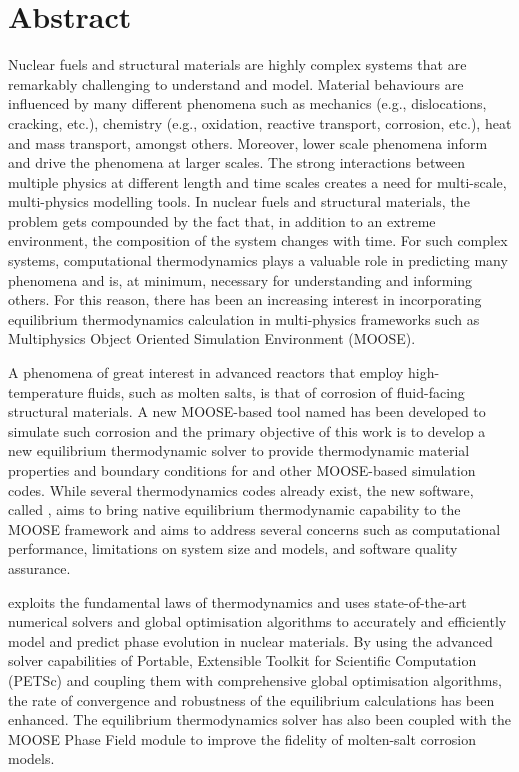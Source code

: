 \chapter*{Abstract}

Nuclear fuels and structural materials are highly complex systems that are remarkably challenging to understand and model. Material behaviours are influenced by many different phenomena such as mechanics (e.g., dislocations, cracking, etc.), chemistry (e.g., oxidation, reactive transport, corrosion, etc.), heat and mass transport, amongst others. Moreover, lower scale phenomena inform and drive the phenomena at larger scales. The strong interactions between multiple physics at different length and time scales creates a need for multi-scale, multi-physics modelling tools. In nuclear fuels and structural materials, the problem gets compounded by the fact that, in addition to an extreme environment, the composition of the system changes with time. For such complex systems, computational thermodynamics plays a valuable role in predicting many phenomena and is, at minimum, necessary for understanding and informing others. For this reason, there has been an increasing interest in incorporating equilibrium thermodynamics calculation in multi-physics frameworks such as Multiphysics Object Oriented Simulation Environment (MOOSE).

A phenomena of great interest in advanced reactors that employ high-temperature fluids, such as molten salts, is that of corrosion of fluid-facing structural materials. A new MOOSE-based tool named {\YJ} has been developed to simulate such corrosion and the primary objective of this work is to develop a new equilibrium thermodynamic solver to provide thermodynamic material properties and boundary conditions for {\YJ} and other MOOSE-based simulation codes. While several thermodynamics codes already exist, the new software, called {\GEM}, aims to bring native equilibrium thermodynamic capability to the MOOSE framework and aims to address several concerns such as computational performance, limitations on system size and models, and software quality assurance.

{\GEM} exploits the fundamental laws of thermodynamics and uses state-of-the-art numerical solvers and global optimisation algorithms to accurately and efficiently model and predict phase evolution in nuclear materials. By using the advanced solver capabilities of Portable, Extensible Toolkit for Scientific Computation (PETSc) and coupling them with comprehensive global optimisation algorithms, the rate of convergence and robustness of the equilibrium calculations has been enhanced. The equilibrium thermodynamics solver has also been coupled with the MOOSE Phase Field module to improve the fidelity of molten-salt corrosion models.


